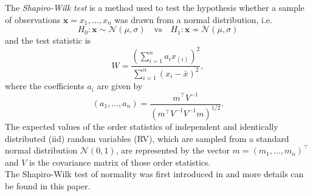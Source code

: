 
The \textit{Shapiro-Wilk test} is a method used to test the hypothesis whether a sample of observations $ \bm{x} = x_1, \ldots, x_n$ was drawn from a normal distribution, i.e.
$$
H_0: \bm{x} \sim \mathcal{N}(\mu, \sigma) \quad \text{vs} \quad H_1: \bm{x} \nsim \mathcal{N}(\mu, \sigma)
$$
and the test statistic is
$$
W=\frac{\left(\sum\limits_{i=1}^{n} a_{i} x_{(i)}\right)^{2}}{\sum\limits_{i=1}^{n}\left(x_{i}-\bar{x}\right)^{2}},
$$
where the coefficients $a_i$ are given by 
$$
\left(a_{1}, \ldots, a_{n}\right)=\frac{m^{\top} V^{-1}}{\left(m^{\top} V^{-1} V^{-1} m\right)^{1 / 2}}.
$$
The expected values of the order statistics of independent and identically distributed (iid) random variables (RV), which are sampled from a standard normal distribution $\mathcal{N}(0,1)$, are represented by the vector $m=\left(m_{1}, \dots, m_{n}\right)^{\top}$ and $V$ is the covariance matrix of those order statistics.\\
The Shapiro-Wilk test of normality was first introduced in \cite{shapiro1965analysis} and more details can be found in this paper.

















